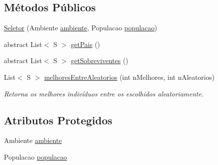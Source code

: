 \subsection*{Métodos Públicos}
\begin{DoxyCompactItemize}
\item 
\hyperlink{classic_1_1populacional_1_1algoritmo_1_1operadores_1_1_seletor_3_01_gextends_01_number_01_6_comp1cb45fdcf61805e0533898ec8098c80d_a7c9bcb3b417d075c1b4deb3dfd7f8c6a}{Seletor} (Ambiente \hyperlink{classic_1_1populacional_1_1algoritmo_1_1operadores_1_1_seletor_3_01_gextends_01_number_01_6_comp1cb45fdcf61805e0533898ec8098c80d_ae37847f40473f702dbee3d27875daf10}{ambiente}, Populacao \hyperlink{classic_1_1populacional_1_1algoritmo_1_1operadores_1_1_seletor_3_01_gextends_01_number_01_6_comp1cb45fdcf61805e0533898ec8098c80d_adcfe10d9432643be21b2f9e605a6338c}{populacao})
\item 
abstract List$<$ S $>$ \hyperlink{classic_1_1populacional_1_1algoritmo_1_1operadores_1_1_seletor_3_01_gextends_01_number_01_6_comp1cb45fdcf61805e0533898ec8098c80d_a78e607afcfe6b3819a1818d05a34c420}{get\-Pais} ()
\item 
abstract List$<$ S $>$ \hyperlink{classic_1_1populacional_1_1algoritmo_1_1operadores_1_1_seletor_3_01_gextends_01_number_01_6_comp1cb45fdcf61805e0533898ec8098c80d_aacfd4141a6bd4050bc88097f2ff73c7b}{get\-Sobreviventes} ()
\item 
List$<$ S $>$ \hyperlink{classic_1_1populacional_1_1algoritmo_1_1operadores_1_1_seletor_3_01_gextends_01_number_01_6_comp1cb45fdcf61805e0533898ec8098c80d_a2eb06a387793a6190c98b2fdc4888b10}{melhores\-Entre\-Aleatorios} (int n\-Melhores, int n\-Aleatorios)
\begin{DoxyCompactList}\small\item\em Retorna os melhores indivíduos entre os escolhidos aleatoriamente. \end{DoxyCompactList}\end{DoxyCompactItemize}
\subsection*{Atributos Protegidos}
\begin{DoxyCompactItemize}
\item 
Ambiente \hyperlink{classic_1_1populacional_1_1algoritmo_1_1operadores_1_1_seletor_3_01_gextends_01_number_01_6_comp1cb45fdcf61805e0533898ec8098c80d_ae37847f40473f702dbee3d27875daf10}{ambiente}
\item 
Populacao \hyperlink{classic_1_1populacional_1_1algoritmo_1_1operadores_1_1_seletor_3_01_gextends_01_number_01_6_comp1cb45fdcf61805e0533898ec8098c80d_adcfe10d9432643be21b2f9e605a6338c}{populacao}
\end{DoxyCompactItemize}


